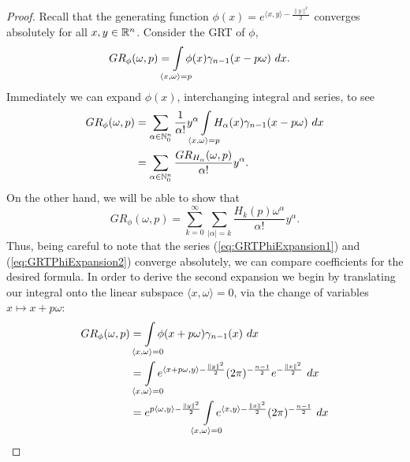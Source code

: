 \begin{proof}
  Recall that the generating function $\phi(x) = e^{\langle x, y\rangle - \frac{\|y\|^2}2}$ converges absolutely for all $x,y \in \mathbb{R}^n$. Consider the GRT of $\phi$,
  \begin{align*}
    GR_{\phi}(\omega, p) 
      &= \int\mclimits_{\langle x, \omega \rangle = p} \phi(x) \gamma_{n-1}(x - p\omega)~dx.
  \end{align*}
  Immediately we can expand $\phi(x)$, interchanging integral and series, to see
  \begin{equation} \label{eq:GRTPhiExpansion1}
    \begin{split}
      GR_{\phi}(\omega, p)
        &= \sum_{\alpha \in \NN_0^n} \frac1{\alpha!} y^\alpha \int\mclimits_{\langle x, \omega\rangle = p} H_\alpha(x) \gamma_{n-1}(x - p\omega)~dx
      \\&= \sum_{\alpha \in \NN_0^n} \frac{GR_{H_\alpha}(\omega, p)}{\alpha!} y^\alpha.
    \end{split}
  \end{equation}
  On the other hand, we will be able to show that
  \begin{equation} \label{eq:GRTPhiExpansion2}
    GR_{\phi}(\omega, p) 
    = \sum_{k = 0}^\infty \sum_{|\alpha| = k} \frac{H_k(p)\omega^\alpha}{\alpha!} y^\alpha.
  \end{equation}
  Thus, being careful to note that the series (\ref{eq:GRTPhiExpansion1}) and (\ref{eq:GRTPhiExpansion2}) converge absolutely, we can compare coefficients for the desired formula. In order to derive the second expansion we begin by translating our integral onto the linear subspace $\langle x, \omega\rangle = 0$, via the change of variables $x \mapsto x + p\omega$:
  \begin{equation}\label{eq:GRTPhiExpansion21}
    \begin{split}
      GR_{\phi}(\omega, p) 
        &= \int\mclimits_{\langle x, \omega\rangle = 0} \phi(x + p\omega) \gamma_{n-1}(x) ~dx 
      \\&= \int\mclimits_{\langle x, \omega\rangle = 0} e^{\langle x + p\omega, y \rangle - \frac{\|y\|^2}2}(2\pi)^{-\frac{n-1}2}e^{-\frac{\|x\|^2}2} ~dx
      \\&= e^{p \langle \omega, y\rangle - \frac{\|y\|^2}2} \int\mclimits_{\langle x, \omega\rangle = 0}e^{\langle x, y\rangle - \frac{\|x\|^2}2} (2\pi)^{-\frac{n-1}2} ~dx
    \end{split}

\end{equation}
\end{proof}
